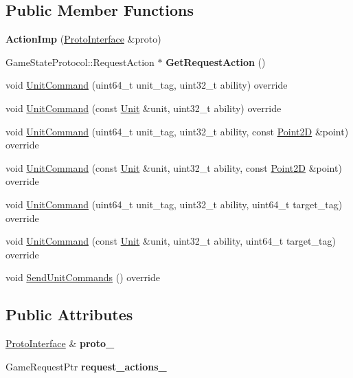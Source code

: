 \subsection*{Public Member Functions}
\begin{DoxyCompactItemize}
\item 
\mbox{\label{classsc2_1_1_action_imp_ae981eb4594b7513781cf94b28461407a}} 
{\bfseries Action\+Imp} (\hyperlink{classsc2_1_1_proto_interface}{Proto\+Interface} \&proto)
\item 
\mbox{\label{classsc2_1_1_action_imp_a936e32c30f50635fac3899b625361ad5}} 
Game\+State\+Protocol\+::\+Request\+Action $\ast$ {\bfseries Get\+Request\+Action} ()
\item 
void \hyperlink{classsc2_1_1_action_imp_a633373febea0f4d74a2888932fa53733}{Unit\+Command} (uint64\+\_\+t unit\+\_\+tag, uint32\+\_\+t ability) override
\item 
void \hyperlink{classsc2_1_1_action_imp_a4b8557f67da3552d161d84f35e80f854}{Unit\+Command} (const \hyperlink{classsc2_1_1_unit}{Unit} \&unit, uint32\+\_\+t ability) override
\item 
void \hyperlink{classsc2_1_1_action_imp_ab4b1431197e8bf2339755756e30c3af2}{Unit\+Command} (uint64\+\_\+t unit\+\_\+tag, uint32\+\_\+t ability, const \hyperlink{structsc2_1_1_point2_d}{Point2D} \&point) override
\item 
void \hyperlink{classsc2_1_1_action_imp_a1ba75d04c3771eee8f97f8ac03eaafc1}{Unit\+Command} (const \hyperlink{classsc2_1_1_unit}{Unit} \&unit, uint32\+\_\+t ability, const \hyperlink{structsc2_1_1_point2_d}{Point2D} \&point) override
\item 
void \hyperlink{classsc2_1_1_action_imp_aba8628a8421f0e879efdb0c19018f7d6}{Unit\+Command} (uint64\+\_\+t unit\+\_\+tag, uint32\+\_\+t ability, uint64\+\_\+t target\+\_\+tag) override
\item 
void \hyperlink{classsc2_1_1_action_imp_adeb0b8dc66628da18902cbc39a292a4d}{Unit\+Command} (const \hyperlink{classsc2_1_1_unit}{Unit} \&unit, uint32\+\_\+t ability, uint64\+\_\+t target\+\_\+tag) override
\item 
void \hyperlink{classsc2_1_1_action_imp_a1edc0de46368f2c2edb79aa098727fb4}{Send\+Unit\+Commands} () override
\end{DoxyCompactItemize}
\subsection*{Public Attributes}
\begin{DoxyCompactItemize}
\item 
\mbox{\label{classsc2_1_1_action_imp_a33cd09a38d62343c8fc4f3e22a698556}} 
\hyperlink{classsc2_1_1_proto_interface}{Proto\+Interface} \& {\bfseries proto\+\_\+}
\item 
\mbox{\label{classsc2_1_1_action_imp_a14ccd751fb37ec0ec7a477b7bfc01fbf}} 
Game\+Request\+Ptr {\bfseries request\+\_\+actions\+\_\+}
\end{DoxyCompactItemize}


